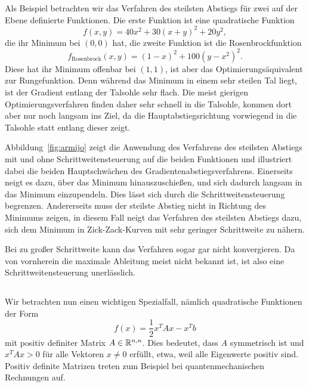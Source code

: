 Als Beispiel betrachten wir das Verfahren des steilsten Abstiegs für
zwei auf der Ebene definierte Funktionen. Die erste Funktion ist eine
quadratische Funktion
\begin{equation}
  \label{eq:quadgl}
  f(x, y) = 40 x^2 + 30(x + y)^2 + 20 y^2,
\end{equation}
die ihr Minimum bei $(0,0)$ hat, die zweite Funktion ist die
Rosenbrockfunktion
\begin{equation}
  f_{\text{Rosenbrock}}(x, y) = (1-x)^2 + 100(y-x^2)^2.
\end{equation}
Diese hat ihr Minimum offenbar bei $(1,1)$, ist aber das
Optimierungsäquivalent zur Rungefunktion. Denn während das Minimum in
einem sehr steilen Tal liegt, ist der Gradient entlang der Talsohle
sehr flach. Die meist gierigen Optimierungsverfahren finden daher sehr
schnell in die Talsohle, kommen dort aber nur noch langsam ins Ziel,
da die Hauptabstiegsrichtung vorwiegend in die Talsohle statt
entlang dieser zeigt.

Abbildung~\ref{fig:armijo} zeigt die Anwendung des Verfahrens des
steilsten Abstiegs mit und ohne Schrittweitensteuerung auf die beiden
Funktionen und illustriert dabei die beiden Hauptschwächen des
Gradientenabstiegsverfahrens. Einerseits neigt es dazu, über das
Minimum hinauszuschießen, und sich dadurch langsam in das Minimum
einzupendeln. Dies lässt sich durch die Schrittweitensteuerung
begrenzen. Andererseits muss der steilste Abstieg nicht in Richtung
des Minimums zeigen, in diesem Fall neigt das Verfahren des steilsten
Abstiegs dazu, sich dem Minimum in Zick-Zack-Kurven mit sehr geringer
Schrittweite zu nähern.

Bei zu großer Schrittweite kann das Verfahren sogar gar nicht
konvergieren. Da von vornherein die maximale Ableitung meist nicht
bekannt ist, ist also eine Schrittweitensteuerung unerlässlich.

\subsection{}

Wir betrachten nun einen wichtigen Spezialfall, nämlich quadratische
Funktionen der Form
\begin{equation}
  \label{eq:cgfunktion}
  f(x) = \frac{1}{2}x^TAx - x^Tb
\end{equation}
mit positiv definiter Matrix $A\in\mathbb{R}^{n,n}$.  Dies bedeutet, dass $A$
symmetrisch ist und $x^TAx>0$ für alle Vektoren $x\neq 0$ erfüllt,
etwa, weil alle Eigenwerte positiv sind.  Positiv definite Matrizen
treten zum Beispiel bei quantenmechanischen Rechnungen auf.

